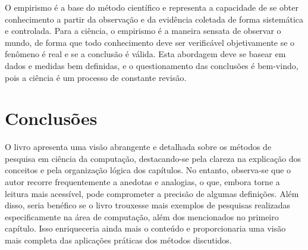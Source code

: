 \documentclass[
	12pt,				%
	openright,			%
	oneside,			%
	a4paper,			%
	chapter=TITLE,		%
	subsection=TITLE,	%
	english,			%
	brazilian,				%
	]{abntex2}
\begin{document}
O empirismo é a base do método científico e representa a capacidade de se obter conhecimento a partir da observação e da evidência coletada de forma sistemática e controlada. Para a ciência, o empirismo é a maneira sensata de observar o mundo, de forma que todo conhecimento deve ser verificável objetivamente se o fenômeno é real e se a conclusão é válida. Esta abordagem deve se basear em dados e medidas bem definidas, e o questionamento das conclusões é bem-vindo, pois a ciência é um processo de constante revisão.

\section*{Conclusões}

O livro apresenta uma visão abrangente e detalhada sobre os métodos de pesquisa em ciência da computação, destacando-se pela clareza na explicação dos conceitos e pela organização lógica dos capítulos. No entanto, observa-se que o autor recorre frequentemente a anedotas e analogias, o que, embora torne a leitura mais acessível, pode comprometer a precisão de algumas definições. Além disso, seria benéfico se o livro trouxesse mais exemplos de pesquisas realizadas especificamente na área de computação, além dos mencionados no primeiro capítulo. Isso enriqueceria ainda mais o conteúdo e proporcionaria uma visão mais completa das aplicações práticas dos métodos discutidos.
\end{document}
